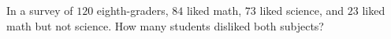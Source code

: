 In a survey of $120$ eighth-graders, $84$ liked math, $73$ liked science, and $23$ liked math but not science. How many students disliked both subjects?
